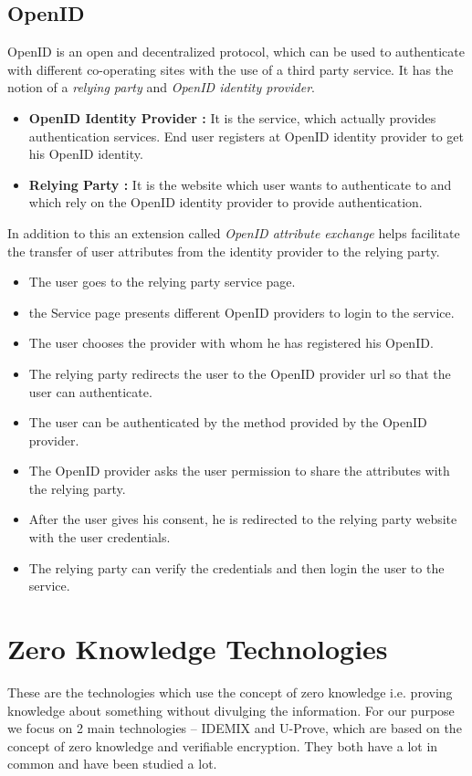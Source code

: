 \subsection{OpenID}
OpenID is an open and decentralized protocol, which can be used to authenticate with different co-operating sites with the use of a third party service. It has the notion of a \textit{relying party} and \textit{OpenID identity provider}.
\begin{itemize}
\item \textbf{OpenID Identity Provider :} It is the service, which actually provides authentication services. End user registers at OpenID identity provider to get his OpenID identity.
\item \textbf{Relying Party :} It is the website which user wants to authenticate to and which rely on the OpenID identity provider to provide authentication.
\end{itemize}
In addition to this an extension called \textit{OpenID attribute exchange} helps facilitate the transfer of user attributes from the identity provider to the relying party.
\begin{itemize}
\item The user goes to the relying party service page.
\item the Service page presents different OpenID providers to login to the service.
\item The user chooses the provider with whom he has registered his OpenID.
\item The relying party redirects the user to the OpenID provider url so that the user can authenticate.
\item The user can be authenticated by the method provided by the OpenID provider.
\item The OpenID provider asks the user permission to share the attributes with the relying party.
\item After the user gives his consent, he is redirected to the relying party website with the user credentials.
\item The relying party can verify the credentials and then login the user to the service.
\end{itemize}
\section{Zero Knowledge Technologies}
These are the technologies which use the concept of zero knowledge i.e. proving knowledge about something without divulging the information. For our purpose we focus on 2 main technologies – IDEMIX and U-Prove, which are based on the concept of zero knowledge and verifiable encryption. They both have a lot in common and have been studied a lot. 
